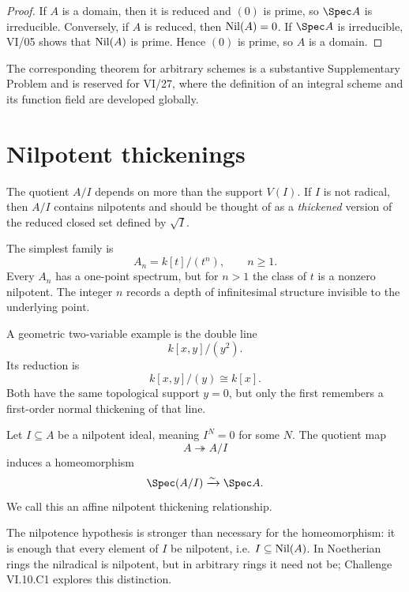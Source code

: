 \begin{proof}
If $A$ is a domain, then it is reduced and $(0)$ is prime, so $\Spec A$ is irreducible.
Conversely, if $A$ is reduced, then $\operatorname{Nil}(A)=0$.  If $\Spec A$ is irreducible, VI/05
shows that $\operatorname{Nil}(A)$ is prime.  Hence $(0)$ is prime, so $A$ is a domain.
\end{proof}



The corresponding theorem for arbitrary schemes is a substantive Supplementary Problem and is
reserved for VI/27, where the definition of an integral scheme and its function field are
developed globally.

\section{Nilpotent thickenings}

The quotient $A/I$ depends on more than the support $V(I)$.  If $I$ is not radical, then
$A/I$ contains nilpotents and should be thought of as a \emph{thickened} version of the
reduced closed set defined by $\sqrt I$.

The simplest family is
\[
A_n=k[t]/(t^n),\qquad n\ge1.
\]
Every $A_n$ has a one-point spectrum, but for $n>1$ the class of $t$ is a nonzero
nilpotent.  The integer $n$ records a depth of infinitesimal structure invisible to the
underlying point.

A geometric two-variable example is the double line
\[
k[x,y]/(y^2).
\]
Its reduction is
\[
k[x,y]/(y)\cong k[x].
\]
Both have the same topological support $y=0$, but only the first remembers a first-order
normal thickening of that line.



\begin{definition}
Let $I\subseteq A$ be a nilpotent ideal, meaning $I^N=0$ for some $N$.  The quotient map
\[
A\twoheadrightarrow A/I
\]
induces a homeomorphism
\[
\Spec(A/I)\xrightarrow{\sim}\Spec A.
\]
We call this an affine nilpotent thickening relationship.
\end{definition}

The nilpotence hypothesis is stronger than necessary for the homeomorphism: it is enough
that every element of $I$ be nilpotent, i.e. $I\subseteq\operatorname{Nil}(A)$.  In Noetherian rings the
nilradical is nilpotent, but in arbitrary rings it need not be; Challenge VI.10.C1 explores
this distinction.

